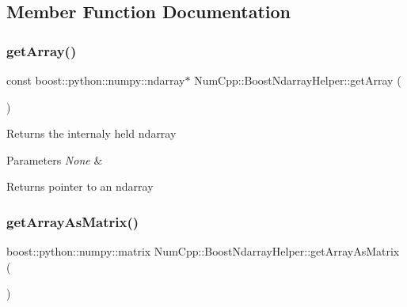 \subsection{Member Function Documentation}
\mbox{\label{class_num_cpp_1_1_boost_ndarray_helper_a1c0c7067349cfa0f1847d7a7059edc43}} 
\subsubsection{\texorpdfstring{get\+Array()}{getArray()}}
{\footnotesize\ttfamily const boost\+::python\+::numpy\+::ndarray$\ast$ Num\+Cpp\+::\+Boost\+Ndarray\+Helper\+::get\+Array (\begin{DoxyParamCaption}{ }\end{DoxyParamCaption})\hspace{0.3cm}{\ttfamily [inline]}}

Returns the internaly held ndarray


\begin{DoxyParams}{Parameters}
{\em None} & \\
\hline
\end{DoxyParams}
\begin{DoxyReturn}{Returns}
pointer to an ndarray 
\end{DoxyReturn}
\mbox{\label{class_num_cpp_1_1_boost_ndarray_helper_a3e6232d550be5b963bc0bb5ab20d8147}} 
\subsubsection{\texorpdfstring{get\+Array\+As\+Matrix()}{getArrayAsMatrix()}}
{\footnotesize\ttfamily boost\+::python\+::numpy\+::matrix Num\+Cpp\+::\+Boost\+Ndarray\+Helper\+::get\+Array\+As\+Matrix (\begin{DoxyParamCaption}{ }\end{DoxyParamCaption})\hspace{0.3cm}{\ttfamily [inline]}}


